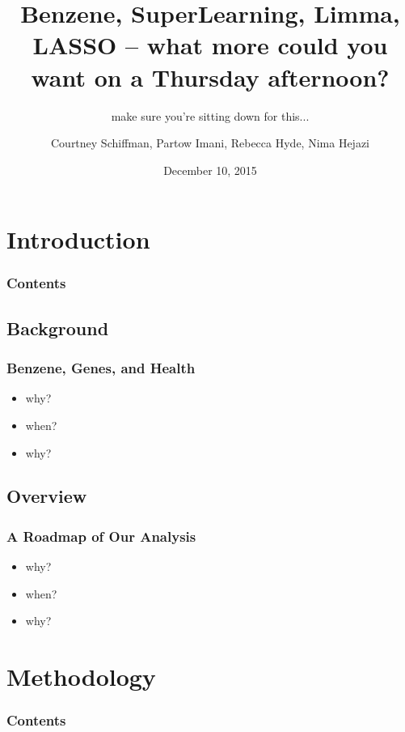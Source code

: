 \documentclass{beamer}
\title{Benzene, SuperLearning, Limma, LASSO -- what more could you want on a Thursday afternoon?}
\subtitle{make sure you're sitting down for this...}
\author{Courtney Schiffman, Partow Imani, Rebecca Hyde, Nima Hejazi}
\institute[UC Berkeley]{University of California, Berkeley}
\date{December 10, 2015}
\begin{document}
\frame{\titlepage}

\section[Outline]{}
\frame{\tableofcontents}


\section{Introduction}

\begin{frame}
	\frametitle{Contents}
	\tableofcontents[currentsection,currentsubsection,hideothersubsections,sectionstyle=show/shaded] 
\end{frame}


\subsection{Background}

\begin{frame}[fragile]
  	\frametitle{Benzene, Genes, and Health}
  		\begin{itemize}
  			\item why?
 			\item when?
  			\item why?     
  		\end{itemize}
\end{frame}

\subsection{Overview}

\begin{frame}[fragile]
  	\frametitle{A Roadmap of Our Analysis}
 		\begin{itemize}
  			\item why?
 			\item when?
  			\item why?     
  		\end{itemize}
\end{frame}

\section{Methodology}

\begin{frame}
        \frametitle{Contents}
        \tableofcontents[currentsection,currentsubsection,hideothersubsections,sectionstyle=show/shaded]
\end{frame}
\end{document}
